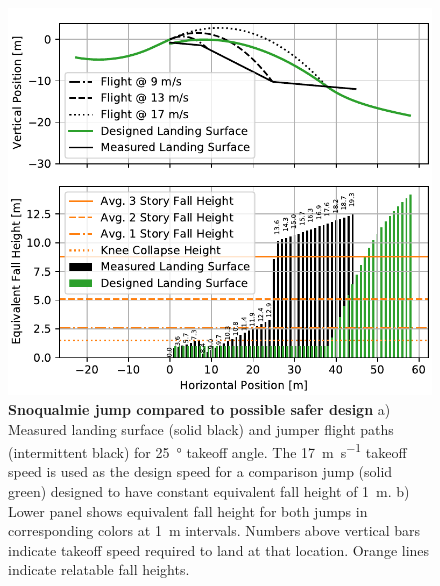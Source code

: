 \documentclass{article}
\begin{document}
\begin{figure}
  \centering
  \includegraphics[width=5.25in]{figures/salvini-v-snoqualmie.pdf}
  \caption{\textbf{Snoqualmie jump compared to possible safer design}
  a) Measured landing surface (solid black) and jumper flight paths (intermittent
  black) for 25~\si{\degree} takeoff angle. The
  17~\si{\meter\per\second} takeoff speed is used as the design speed for a comparison
  jump (solid green) designed to have constant equivalent fall height of 1~\si{\meter}.
  b) Lower panel shows equivalent fall height for both jumps
  in corresponding colors at 1~\si{\meter} intervals. Numbers above
  vertical bars indicate takeoff speed required
  to land at that location. Orange lines indicate relatable fall heights.}
  \label{fig:salvini-v-snoqualmie}
\end{figure}
\end{document}
